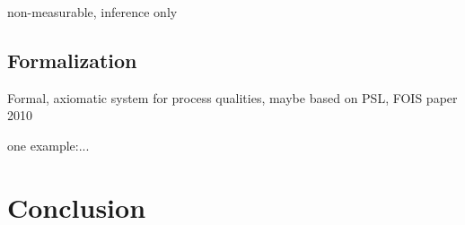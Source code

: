 \documentclass{bioinfo}
\begin{document}
non-measurable, inference only

\subsection{Formalization}
Formal, axiomatic system for process qualities, maybe based on PSL,
FOIS paper 2010

one example:...

\section{Conclusion}




    




 



\end{document}
